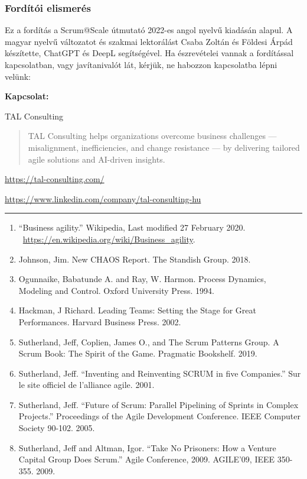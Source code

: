 \documentclass[12pt,a4paper,parskip=full]{scrartcl}
\begin{document}
\subsubsection{Fordítói elismerés}\label{Translators-acknowledgement}
Ez a fordítás a Scrum@Scale útmutató 2022-es angol nyelvű kiadásán alapul. A magyar nyelvű változatot és szakmai lektorálást Csaba Zoltán és Földesi Árpád készítette, ChatGPT és DeepL segítségével.
Ha észrevételei vannak a fordítással kapcsolatban, vagy javítanivalót lát, kérjük, ne habozzon kapcsolatba lépni velünk:

\textbf {Kapcsolat:}
\begin{description}
\itemsep2pt\parskip1pt
\item[Cég:] TAL Consulting
\begin{quote}
TAL Consulting helps organizations overcome business challenges — misalignment, inefficiencies, and change resistance — by delivering tailored agile solutions and AI-driven insights.
\end{quote}

\item[Web:] \href{https://tal-consulting.com/}{https://tal-consulting.com/}
\item[LinkedIn:] \href{https://www.linkedin.com/company/tal-consulting-hu}{https://www.linkedin.com/company/tal-consulting-hu}
\end{description}

\pagebreak
\begin{center}\rule{3in}{0.4pt}\end{center}

\begin{enumerate}
\itemsep1pt\parskip0pt
\item
  ``Business agility.'' Wikipedia, Last modified 27 February 2020.
  \newline ~\href{https://en.wikipedia.org/wiki/Business_agility}{https://en.wikipedia.org/wiki/Business\_agility}.
\item
  Johnson, Jim. New CHAOS Report. The Standish Group. 2018.
\item
  Ogunnaike, Babatunde A. and Ray, W. Harmon. Process Dynamics, Modeling and Control. Oxford University Press. 1994.
\item
  Hackman, J Richard. Leading Teams: Setting the Stage for Great Performances. Harvard Business Press. 2002.
\item
  Sutherland, Jeff, Coplien, James O., and The Scrum Patterns Group. A Scrum Book: The Spirit of the Game. Pragmatic Bookshelf. 2019.
\item
  Sutherland, Jeff. ``Inventing and Reinventing SCRUM in five Companies.'' Sur le site officiel de l'alliance agile. 2001.
\item
  Sutherland, Jeff. ``Future of Scrum: Parallel Pipelining of Sprints in Complex Projects.'' Proceedings of the Agile Development Conference. IEEE Computer Society 90-102. 2005.
\item
  Sutherland, Jeff and Altman, Igor. ``Take No Prisoners: How a Venture Capital Group Does Scrum.'' Agile Conference, 2009. AGILE'09, IEEE
  350-355. 2009.
\end{enumerate}
\end{document}
